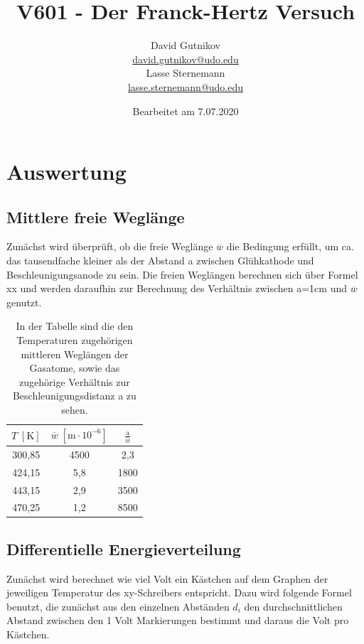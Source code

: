 \documentclass[titlepage = firstcover]{scrartcl}
\title{V601 - Der Franck-Hertz Versuch}
\author{
  David Gutnikov\\
  \href{mailto:david.gutnikov@udo.edu}{david.gutnikov@udo.edu}\\
  Lasse Sternemann\\
  \href{mailto:lasse.sternemann@udo.edu}{lasse.sternemann@udo.edu}
}
\date{Bearbeitet am 7.07.2020}
\begin{document}
    \maketitle
    \newpage
    \tableofcontents
    \newpage

    \section{Auswertung}    
        \subsection{Mittlere freie Weglänge}
            Zunächst wird überprüft, ob die freie Weglänge $\overline{w}$ die Bedingung erfüllt, um ca. das tausendfache kleiner als der Abstand a zwischen Glühkathode und Beschleunigungsanode zu sein.
            Die freien Weglängen berechnen sich über Formel xx und werden daraufhin zur Berechnung des Verhältnis zwischen a=1cm und $\overline{w}$ genutzt.

            \begin{table}[h]
                \centering
                \caption{In der Tabelle sind die den Temperaturen zugehörigen mittleren Weglängen der Gasatome, sowie das zugehörige Verhältnis zur Beschleunigungsdistanz a zu sehen.}
                \label{tab:TabGasdruck}

                \begin{tabular}{c  c c}
                    \toprule
                    {$T \; [\text{K}] $} & {$\overline{w} \; [\text{m}\cdot 10^{-6}]$} &  {$\frac{\text{a}}{\overline{w}}$} \\
                    \midrule
                    300,85 & 4500 & 2,3 \\
                    424,15 & 5,8 &  1800  \\
                    443,15 & 2,9 &  3500  \\
                    470,25 & 1,2 &  8500  \\
                    \bottomrule
                \end{tabular}

            \end{table}

        \newpage
        \subsection{Differentielle Energieverteilung}
            Zunächst wird berechnet wie viel Volt ein Kästchen auf dem Graphen der jeweiligen Temperatur des xy-Schreibers entspricht. Dazu wird folgende Formel benutzt, die zunächst aus den 
            einzelnen Abständen $d_i$ den durchschnittlichen Abstand zwischen den 1 Volt Markierungen bestimmt und daraus die Volt pro Kästchen.
\end{document}
